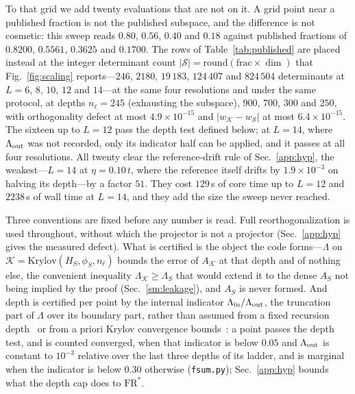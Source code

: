 To that grid we add twenty evaluations that are not on it. A grid point near a published fraction is
not the published subspace, and the difference is not cosmetic: this sweep reads $0.80$, $0.56$,
$0.40$ and $0.18$ against published fractions of $0.8200$, $0.5561$, $0.3625$ and $0.1700$. The rows
of Table~\ref{tab:published} are placed instead at the integer determinant count
$\lvert\mathcal S\rvert=\mathrm{round}(\mathrm{frac}\times\dim)$ that Fig.~\ref{fig:scaling}
reports---$246$, $2180$, $19\,183$, $124\,407$ and $824\,504$ determinants at $L=6$, $8$, $10$, $12$
and $14$---at the same four resolutions and under the same protocol, at depths $n_\ell=245$
(exhausting the subspace), $900$, $700$, $300$ and $250$, with orthogonality defect at most
$4.9\times10^{-15}$ and $\lvert w_{\mathcal K}-w_{\mathcal S}\rvert$ at most $6.4\times10^{-15}$. The
sixteen up to $L=12$ pass the depth test defined below; at $L=14$, where $\Lambda_{\rm out}$ was not
recorded, only its indicator half can be applied, and it passes at all four resolutions. All twenty
clear the reference-drift rule of Sec.~\ref{app:hyp}, the
%
%
%
%
weakest---$L=14$ at $\eta=0.10\,t$, where the reference itself drifts by $1.9\times10^{-3}$ on
halving its depth---by a factor $51$. They cost $129$\,s of core time up to $L=12$ and $2238$\,s of
wall time at $L=14$, and they add the size the sweep never reached.

Three conventions are fixed before any number is read. Full reorthogonalization is used throughout,
without which the projector is not a projector (Sec.~\ref{app:hyp} gives the measured defect). What
is certified is the object the code forms---$\Lambda$ on
$\mathcal K=\mathrm{Krylov}(H_S,\phi_S,n_\ell)$ bounds the error
of $A_{\mathcal K}$ at that depth and of nothing else, the convenient inequality
$\Lambda_{\mathcal K}\ge\Lambda_S$ that would extend it to the dense $A_S$ not being implied by the
proof (Sec.~\ref{sm:leakage}), and $A_S$ is never formed. And depth is
certified per point by the internal indicator $\Lambda_{\rm in}/\Lambda_{\rm out}$, the truncation
part of $\Lambda$ over its boundary part, rather than assumed from a fixed recursion
depth~\cite{haydock1972} or from a priori Krylov convergence bounds~\cite{epperly2022}: a point passes the depth test, and is counted converged, when
that indicator is below $0.05$ and $\Lambda_{\rm out}$ is constant to $10^{-3}$ relative over the last
three depths of its ladder, and is marginal when the indicator is below $0.30$ otherwise
(\texttt{fsum.py}); Sec.~\ref{app:hyp} bounds what the depth cap does to
$\mathrm{FR}^{\ast}$.

